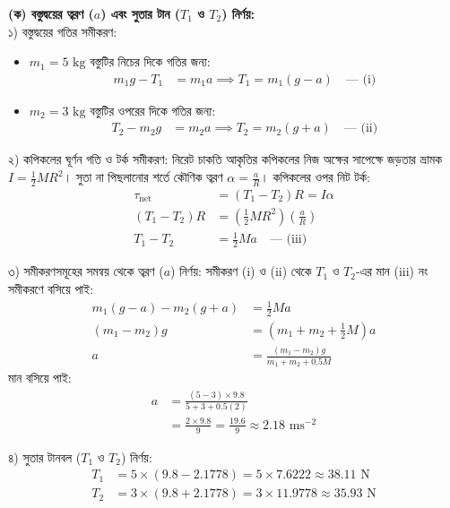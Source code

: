 \documentclass[12pt, a4paper]{article}
\begin{document}
\begin{tcolorbox}[solutionbox={সমাধান (Solution)}]
\noindent
\textbf{(ক) বস্তুদ্বয়ের ত্বরণ ($a$) এবং সুতার টান ($T_1$ ও $T_2$) নির্ণয়:} \\
১) বস্তুদ্বয়ের গতির সমীকরণ:
\begin{itemize}
    \item $m_1 = 5\text{ kg}$ বস্তুটির নিচের দিকে গতির জন্য:
    \begin{align*}
        m_1 g - T_1 &= m_1 a \implies T_1 = m_1 (g - a) \quad \text{--- (i)}
    \end{align*}
    \item $m_2 = 3\text{ kg}$ বস্তুটির ওপরের দিকে গতির জন্য:
    \begin{align*}
        T_2 - m_2 g &= m_2 a \implies T_2 = m_2 (g + a) \quad \text{--- (ii)}
    \end{align*}
\end{itemize}

২) কপিকলের ঘূর্ণন গতি ও টর্ক সমীকরণ: নিরেট চাকতি আকৃতির কপিকলের নিজ অক্ষের সাপেক্ষে জড়তার ভ্রামক $I = \frac{1}{2} M R^2$। সুতা না পিছলানোর শর্তে কৌণিক ত্বরণ $\alpha = \frac{a}{R}$।
কপিকলের ওপর নিট টর্ক:
\begin{align*}
    \tau_{\text{net}} &= (T_1 - T_2) R = I \alpha \\
    (T_1 - T_2) R &= \left(\frac{1}{2} M R^2\right) \left(\frac{a}{R}\right) \\
    T_1 - T_2 &= \frac{1}{2} M a \quad \text{--- (iii)}
\end{align*}

৩) সমীকরণসমূহের সমন্বয় থেকে ত্বরণ ($a$) নির্ণয়: সমীকরণ (i) ও (ii) থেকে $T_1$ ও $T_2$-এর মান (iii) নং সমীকরণে বসিয়ে পাই:
\begin{align*}
    m_1 (g - a) - m_2 (g + a) &= \frac{1}{2} M a \\
    (m_1 - m_2) g &= \left(m_1 + m_2 + \frac{1}{2} M\right) a \\
    a &= \frac{(m_1 - m_2) g}{m_1 + m_2 + 0.5 M}
\end{align*}
মান বসিয়ে পাই:
\begin{align*}
    a &= \frac{(5 - 3) \times 9.8}{5 + 3 + 0.5(2)} \\
      &= \frac{2 \times 9.8}{9} = \frac{19.6}{9} \approx \mathbf{2.18}\text{ ms}^{-2}
\end{align*}

৪) সুতার টানবল ($T_1$ ও $T_2$) নির্ণয়:
\begin{align*}
    T_1 &= 5 \times (9.8 - 2.1778) = 5 \times 7.6222 \approx \mathbf{38.11}\text{ N} \\
    T_2 &= 3 \times (9.8 + 2.1778) = 3 \times 11.9778 \approx \mathbf{35.93}\text{ N}
\end{align*}


\end{tcolorbox}
\end{document}
